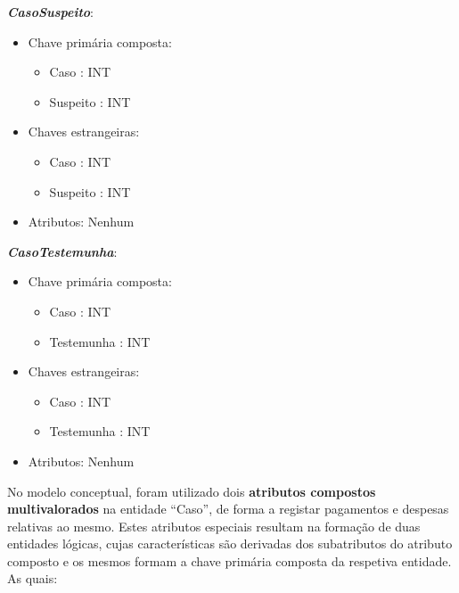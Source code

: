 \documentclass[a4paper,12pt]{scrreprt}
\begin{document}
        \textbf{\textit{CasoSuspeito}}:
        \begin{itemize}
            \item Chave primária composta:
                \begin{itemize}
                    \item Caso : INT
                    \item Suspeito : INT
                \end{itemize}
            \item Chaves estrangeiras:
                \begin{itemize}
                    \item Caso : INT
                    \item Suspeito : INT
                \end{itemize}
            \item Atributos: Nenhum
        \end{itemize}

        \vspace{0.5cm}            
        
        \textbf{\textit{CasoTestemunha}}:
        \begin{itemize}
            \item Chave primária composta:
                \begin{itemize}
                    \item Caso : INT
                    \item Testemunha : INT
                \end{itemize}
            \item Chaves estrangeiras:
                \begin{itemize}
                    \item Caso : INT
                    \item Testemunha : INT
                \end{itemize}
            \item Atributos: Nenhum
        \end{itemize}

        \clearpage

        No modelo conceptual, foram utilizado dois \textbf{atributos compostos multivalorados} na entidade “Caso”, de forma a registar pagamentos e despesas relativas ao mesmo. Estes atributos especiais resultam na formação de duas entidades lógicas, cujas características são derivadas dos subatributos do atributo composto e os mesmos formam a chave primária composta da respetiva entidade. As quais:
        
\end{document}
